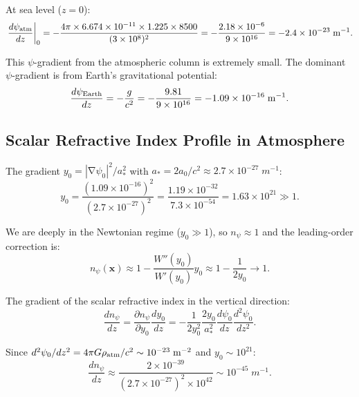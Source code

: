 \documentclass[aps,prd,twocolumn,superscriptaddress]{revtex4-2}
\newcommand{\npsi}{n_\psi}
\DeclareMathOperator{\grad}{\nabla}
\begin{document}
At sea level ($z = 0$):
\begin{equation}
\left.\frac{d\psi_{\rm atm}}{dz}\right|_0
= -\frac{4\pi\times6.674\times10^{-11}\times1.225\times8500}
{(3\times10^8)^2}
= -\frac{2.18\times10^{-6}}{9\times10^{16}}
= -2.4\times10^{-23}\;\si{m^{-1}}.
\label{eq:dpsi-num}
\end{equation}

This $\psi$-gradient from the atmospheric column is extremely small.
The dominant $\psi$-gradient is from Earth's gravitational potential:
\begin{equation}
\frac{d\psi_{\rm Earth}}{dz} = -\frac{g}{c^2}
= -\frac{9.81}{9\times10^{16}} = -1.09\times10^{-16}\;\si{m^{-1}}.
\label{eq:dpsi-earth}
\end{equation}

\subsection{Scalar Refractive Index Profile in Atmosphere}

The gradient $y_0 = |\grad\psi_0|^2/a_*^2$ with
$a_* = 2a_0/c^2 \approx 2.7\times10^{-27}\;\si{m^{-1}}$:
\begin{equation}
y_0 = \frac{(1.09\times10^{-16})^2}{(2.7\times10^{-27})^2}
= \frac{1.19\times10^{-32}}{7.3\times10^{-54}} = 1.63\times10^{21} \gg 1.
\label{eq:y0-earth}
\end{equation}

We are deeply in the Newtonian regime ($y_0 \gg 1$), so $\npsi \approx 1$
and the leading-order correction is:
\begin{equation}
\npsi(\mathbf{x}) \approx 1 - \frac{W''(y_0)}{W'(y_0)}y_0
\approx 1 - \frac{1}{2y_0}\to 1.
\label{eq:npsi-leading}
\end{equation}

The gradient of the scalar refractive index in the vertical direction:
\begin{equation}
\frac{d\npsi}{dz} = \frac{\partial \npsi}{\partial y_0}\frac{dy_0}{dz}
= -\frac{1}{2y_0^2}\frac{2 y_0}{a_*^2}\frac{d\psi_0}{dz}\frac{d^2\psi_0}{dz^2}.
\label{eq:dnpsi-dz}
\end{equation}

Since $d^2\psi_0/dz^2 = 4\pi G\rho_{\rm atm}/c^2 \sim 10^{-23}\;\si{m^{-2}}$
and $y_0 \sim 10^{21}$:
\begin{equation}
\frac{d\npsi}{dz} \approx \frac{2\times10^{-39}}{(2.7\times10^{-27})^2\times 10^{42}}
\sim 10^{-45}\;\si{m^{-1}}.
\label{eq:dnpsi-num}
\end{equation}
\end{document}
